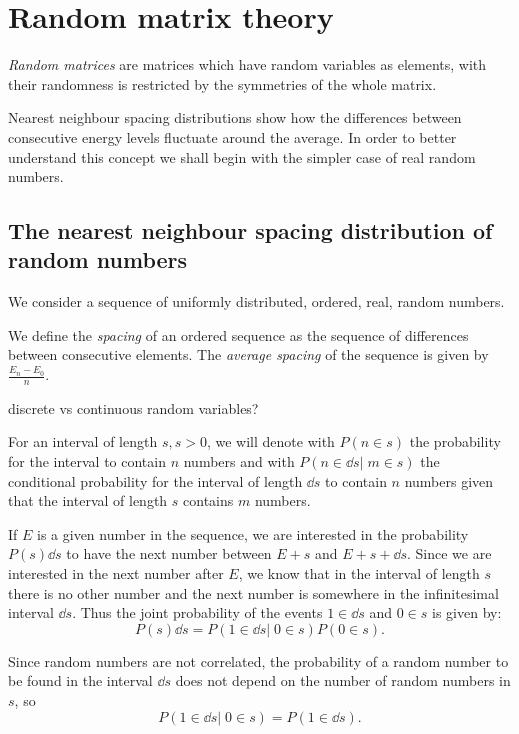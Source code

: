 \documentclass[../thesis.tex]{subfiles}
\theoremstyle{definition}
\begin{document}
\section{Random matrix theory}

\emph{Random matrices} are matrices which have random variables as elements,
with their randomness is restricted by the symmetries of the whole matrix.

Nearest neighbour spacing distributions show how the differences
between consecutive energy levels fluctuate around the average.
In order to better understand this concept we shall begin with the simpler
case of real random numbers.

\subsection{The nearest neighbour spacing distribution of random numbers}

We consider a sequence of uniformly distributed, ordered, real, random numbers.

{\color{red}
We define the \emph{spacing} of an ordered sequence as the sequence of
differences between consecutive elements.
The \emph{average spacing} of the sequence is given by \(\frac{E_n-E_0}{n}\).

discrete vs continuous random variables?
}

For an interval of length \(s, s>0\), we will denote with \( P(n \in s) \) the probability
for the interval to contain $n$ numbers and with \( P(n \in \dd{s} |\; m \in s) \)
the conditional probability for the interval of length \( \dd{s} \) to contain
$n$ numbers given that the interval of length $s$ contains $m$ numbers.

If $E$ is a given number in the sequence, we are interested in the probability
\( P(s)\dd{s} \) to have the next number between \( E+s \) and \( E+s+\dd{s} \).
Since we are interested in the next number after $E$, we know that in the
interval of length $s$ there is no other number and the next number is somewhere
in the infinitesimal interval \(\dd{s}\). Thus the joint probability of
the events \(1 \in \dd{s}\) and \(0 \in s\) is given by:
\begin{equation}
  \label{eq:jpr-next}
  P(s)\dd{s} = P(1 \in \dd{s} |\; 0 \in s) P(0 \in s).
\end{equation}

Since random numbers are not correlated, the probability of a random number to be found
in the interval \( \dd{s} \) does not depend on the number of random numbers in $s$, so
\[
  P(1 \in \dd{s} |\; 0 \in s) = P(1 \in \dd{s}).
\]
\end{document}

